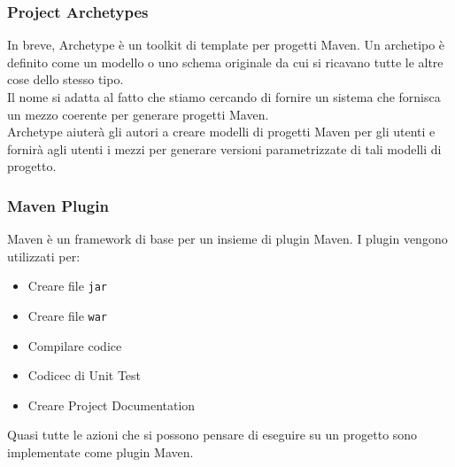 \subsubsection{Project Archetypes}
In breve, Archetype è un toolkit di template per progetti Maven. Un archetipo è definito come un modello o uno schema originale da cui si ricavano tutte le altre cose dello stesso tipo. \\
Il nome si adatta al fatto che stiamo cercando di fornire un sistema che fornisca un mezzo coerente per generare progetti Maven. \\
Archetype aiuterà gli autori a creare modelli di progetti Maven per gli utenti e fornirà agli utenti i mezzi per generare versioni parametrizzate di tali modelli di progetto.

\subsubsection{Maven Plugin}
Maven è un framework di base per un insieme di plugin Maven. I plugin vengono utilizzati per:
\begin{itemize}
    \item Creare file \verb|jar|
    \item Creare file \verb|war|
    \item Compilare codice
    \item Codicec di Unit Test
    \item Creare Project Documentation
\end{itemize}
Quasi tutte le azioni che si possono pensare di eseguire su un progetto sono implementate come plugin Maven.

\newpage